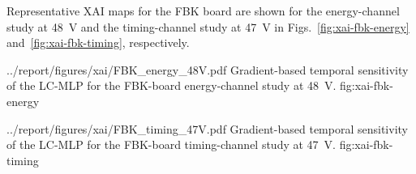 Representative XAI maps for the FBK board are shown for the energy-channel study at \SI{48}{V} and the timing-channel study at \SI{47}{V} in Figs.~\ref{fig:xai-fbk-energy} and~\ref{fig:xai-fbk-timing}, respectively.

\reportfigure
    {../report/figures/xai/FBK_energy_48V.pdf}
    {Gradient-based temporal sensitivity of the LC-MLP for the FBK-board energy-channel study at \SI{48}{V}.}
    {fig:xai-fbk-energy}

\reportfigure
    {../report/figures/xai/FBK_timing_47V.pdf}
    {Gradient-based temporal sensitivity of the LC-MLP for the FBK-board timing-channel study at \SI{47}{V}.}
    {fig:xai-fbk-timing}
